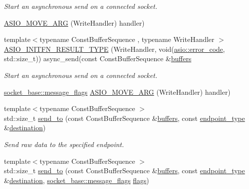 \begin{DoxyCompactItemize}
\begin{DoxyCompactList}\small\item\em Start an asynchronous send on a connected socket. \end{DoxyCompactList}\item 
\hyperlink{classasio_1_1basic__raw__socket_a45b29453afd5a6a0e175f74d1d1d1c49}{A\+S\+I\+O\+\_\+\+M\+O\+V\+E\+\_\+\+A\+R\+G} (Write\+Handler) handler)
\item 
{\footnotesize template$<$typename Const\+Buffer\+Sequence , typename Write\+Handler $>$ }\\\hyperlink{classasio_1_1basic__raw__socket_a54cf87e28b67267f43f5869b894ca7a4}{A\+S\+I\+O\+\_\+\+I\+N\+I\+T\+F\+N\+\_\+\+R\+E\+S\+U\+L\+T\+\_\+\+T\+Y\+P\+E} (Write\+Handler, void(\hyperlink{classasio_1_1error__code}{asio\+::error\+\_\+code}, std\+::size\+\_\+t)) async\+\_\+send(const Const\+Buffer\+Sequence \&\hyperlink{group__async__read_ga54dede45c3175148a77fe6635222c47d}{buffers}
\begin{DoxyCompactList}\small\item\em Start an asynchronous send on a connected socket. \end{DoxyCompactList}\item 
\hyperlink{classasio_1_1socket__base_ac3cf77465dfedfe1979b5415cf32cc94}{socket\+\_\+base\+::message\+\_\+flags} \hyperlink{classasio_1_1basic__raw__socket_a585c4083aad9cba4ab7e3311a5b4575f}{A\+S\+I\+O\+\_\+\+M\+O\+V\+E\+\_\+\+A\+R\+G} (Write\+Handler) handler)
\item 
{\footnotesize template$<$typename Const\+Buffer\+Sequence $>$ }\\std\+::size\+\_\+t \hyperlink{classasio_1_1basic__raw__socket_af9c8efdf4c7ca386914dc596ea741226}{send\+\_\+to} (const Const\+Buffer\+Sequence \&\hyperlink{group__async__read_ga54dede45c3175148a77fe6635222c47d}{buffers}, const \hyperlink{classasio_1_1basic__raw__socket_a75803815223ab2cbfa66c51a650236b5}{endpoint\+\_\+type} \&\hyperlink{classasio_1_1basic__raw__socket_ad4085e3f776b88e9f818fd8f34295ecb}{destination})
\begin{DoxyCompactList}\small\item\em Send raw data to the specified endpoint. \end{DoxyCompactList}\item 
{\footnotesize template$<$typename Const\+Buffer\+Sequence $>$ }\\std\+::size\+\_\+t \hyperlink{classasio_1_1basic__raw__socket_a294142d105ec0306f52113aa45d11ee3}{send\+\_\+to} (const Const\+Buffer\+Sequence \&\hyperlink{group__async__read_ga54dede45c3175148a77fe6635222c47d}{buffers}, const \hyperlink{classasio_1_1basic__raw__socket_a75803815223ab2cbfa66c51a650236b5}{endpoint\+\_\+type} \&\hyperlink{classasio_1_1basic__raw__socket_ad4085e3f776b88e9f818fd8f34295ecb}{destination}, \hyperlink{classasio_1_1socket__base_ac3cf77465dfedfe1979b5415cf32cc94}{socket\+\_\+base\+::message\+\_\+flags} \hyperlink{classasio_1_1basic__raw__socket_a324289af06e6526b244c1074db009c3f}{flags})

\end{DoxyCompactItemize}
